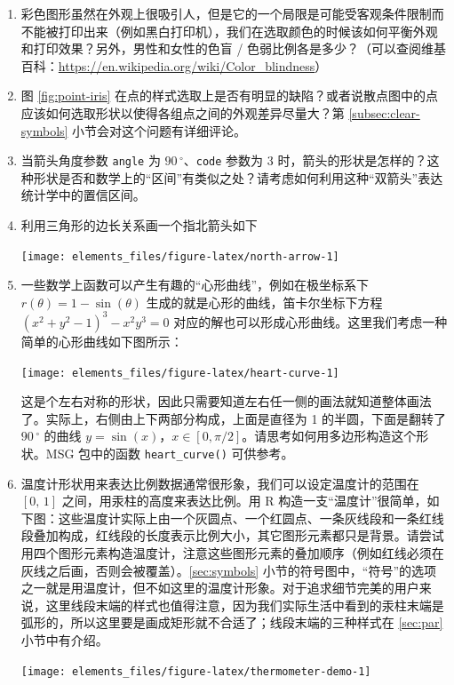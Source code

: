 \documentclass[
  b5paper,
  UTF8,twoside]{book}
\begin{document}
\begin{enumerate}
\def\labelenumi{\arabic{enumi}.}
\item
  彩色图形虽然在外观上很吸引人，但是它的一个局限是可能受客观条件限制而不能被打印出来（例如黑白打印机），我们在选取颜色的时候该如何平衡外观和打印效果？另外，男性和女性的色盲 / 色弱比例各是多少？（可以查阅维基百科：\url{https://en.wikipedia.org/wiki/Color_blindness}）
\item
  图 \ref{fig:point-iris} 在点的样式选取上是否有明显的缺陷？或者说散点图中的点应该如何选取形状以使得各组点之间的外观差异尽量大？第 \ref{subsec:clear-symbols} 小节会对这个问题有详细评论。
\item
  当箭头角度参数 \texttt{angle} 为 \(90\,^{\circ}\)、\texttt{code} 参数为 3 时，箭头的形状是怎样的？这种形状是否和数学上的``区间''有类似之处？请考虑如何利用这种``双箭头''表达统计学中的置信区间。
\item
  利用三角形的边长关系画一个指北箭头如下

  \begin{center}\texttt{[image: elements\_files/figure-latex/north-arrow-1]} \end{center}
\item
  一些数学上函数可以产生有趣的``心形曲线''，例如在极坐标系下 \(r(\theta)=1-\sin(\theta)\) 生成的就是心形的曲线，笛卡尔坐标下方程 \((x^{2}+y^{2}-1)^{3}-x^{2}y^{3}=0\) 对应的解也可以形成心形曲线。这里我们考虑一种简单的心形曲线如下图所示：

  \begin{center}\texttt{[image: elements\_files/figure-latex/heart-curve-1]} \end{center}

  这是个左右对称的形状，因此只需要知道左右任一侧的画法就知道整体画法了。实际上，右侧由上下两部分构成，上面是直径为 1 的半圆，下面是翻转了 \(90\,^{\circ}\) 的曲线 \(y=\sin(x)，x\in[0,\pi/2]\)。请思考如何用多边形构造这个形状。MSG 包中的函数 \texttt{heart\_curve()} 可供参考。
\item
  温度计形状用来表达比例数据通常很形象，我们可以设定温度计的范围在 \([0,\,1]\) 之间，用汞柱的高度来表达比例。用 R 构造一支``温度计''很简单，如下图：这些温度计实际上由一个灰圆点、一个红圆点、一条灰线段和一条红线段叠加构成，红线段的长度表示比例大小，其它图形元素都只是背景。请尝试用四个图形元素构造温度计，注意这些图形元素的叠加顺序（例如红线必须在灰线之后画，否则会被覆盖）。\ref{sec:symbols} 小节的符号图中，``符号''的选项之一就是用温度计，但不如这里的温度计形象。对于追求细节完美的用户来说，这里线段末端的样式也值得注意，因为我们实际生活中看到的汞柱末端是弧形的，所以这里要是画成矩形就不合适了；线段末端的三种样式在 \ref{sec:par} 小节中有介绍。

  \begin{center}\texttt{[image: elements\_files/figure-latex/thermometer-demo-1]} \end{center}
\end{enumerate}
\end{document}
